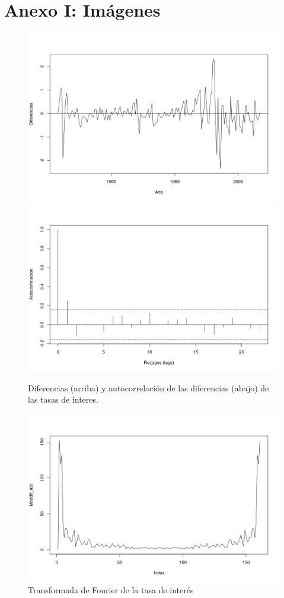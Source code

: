 \documentclass[a4paper]{article}
\begin{document}
\section{Anexo I: Imágenes}
\begin{figure}[H]
	\centering
	\includegraphics[width=0.75\linewidth]{ir_diff.png}
	\includegraphics[width=0.75\linewidth]{ir_diff_acf.png}
	\caption{Diferencias (arriba) y autocorrelación de las diferencias (abajo) de las tasas de interes.} 	
	\label{fig:ir_diff_acf}
\end{figure}

\begin{figure}[H]
	\centering
	\includegraphics[width=0.8\linewidth]{ir_fft.png}
	\caption{Transformada de Fourier de la tasa de interés} 	
	\label{fig:ir_fft}
\end{figure}
\end{document}
